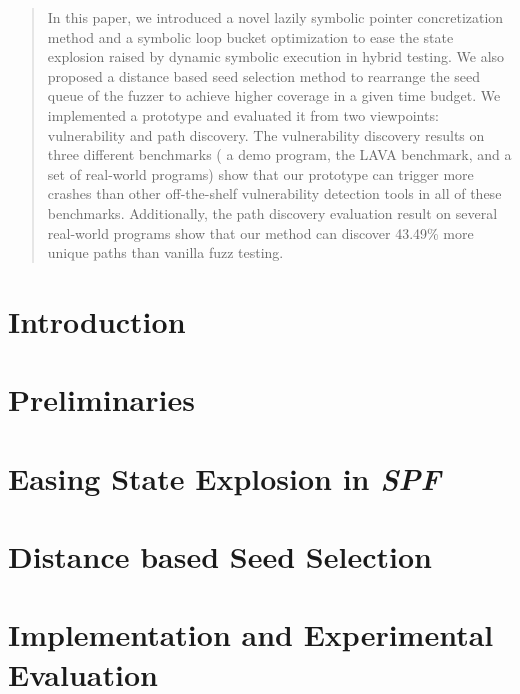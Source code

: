 \documentclass{cta-author}
\begin{document}
\begin{abstract}
In this paper, we introduced a novel lazily symbolic pointer concretization method and a symbolic loop bucket optimization to ease the state explosion raised by dynamic symbolic execution in hybrid testing.
We also proposed a distance based seed selection method to rearrange the seed queue of the fuzzer to achieve higher coverage in a given time budget. We implemented a prototype and evaluated it from two viewpoints: vulnerability and path discovery. 
The vulnerability discovery results on three different benchmarks (
a demo program, the LAVA benchmark, and a set of real-world programs) show that our prototype can trigger more crashes than other off-the-shelf vulnerability detection tools in all of these benchmarks. Additionally, the path discovery evaluation result on several real-world programs show that our method can discover 43.49\% more unique paths than vanilla fuzz testing.
\end{abstract}

\maketitle

\section{Introduction} \label{sec:introduction}



\section{Preliminaries} \label{sec:preliminaries}


\section{Easing State Explosion in \textit{SPF}} \label{sec:ease PE}

%
\section{Distance based Seed Selection} \label{sec:seed selection}

%
\section{Implementation and Experimental Evaluation} \label{sec:evaluate}



\end{document}

